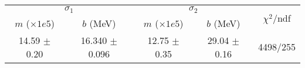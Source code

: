 \begin{tabular}{cc|cc||c}
\multicolumn{2}{c|}{$\sigma_1$} & \multicolumn{2}{|c}{$\sigma_2$}  & \multirow{2}{*}{$\chi^2/$ndf}\\
$m$ ($\times1e5$) & $b$ (MeV) & $m$ ($\times1e5$) & $b$ (MeV)  & \\
\hline
14.59 $\pm$ 0.20 & 16.340 $\pm$ 0.096 & 12.75 $\pm$ 0.35 & 29.04 $\pm$ 0.16 & 4498/255\\
\end{tabular}
